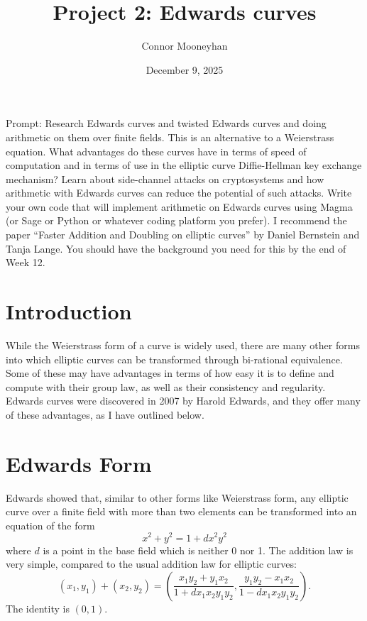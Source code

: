 \documentclass[12pt]{article}
\title{Project 2: Edwards curves}
\author{Connor Mooneyhan}
\date{December 9, 2025}
\theoremstyle{definition}
\begin{document}
\maketitle

Prompt: Research Edwards curves and twisted Edwards curves and doing arithmetic on them over finite fields.
This is an alternative to a Weierstrass equation.
What advantages do these curves have in terms of speed of computation and in terms of use in the elliptic curve Diffie-Hellman key exchange mechanism? Learn about side-channel attacks on cryptosystems and how arithmetic with Edwards curves can reduce the potential of such attacks.
Write your own code that will implement arithmetic on Edwards curves using Magma (or Sage or Python or whatever coding platform you prefer).
I recommend the paper “Faster Addition and Doubling on elliptic curves” by Daniel Bernstein and Tanja Lange.
You should have the background you need for this by the end of Week 12.

\section{Introduction}
While the Weierstrass form of a curve is widely used, there are many other forms into which elliptic curves can be transformed through bi-rational equivalence.
Some of these may have advantages in terms of how easy it is to define and compute with their group law, as well as their consistency and regularity.
Edwards curves were discovered in 2007 by Harold Edwards, and they offer many of these advantages, as I have outlined below.

\section{Edwards Form}
Edwards showed that, similar to other forms like Weierstrass form, any elliptic curve over a finite field with more than two elements can be transformed into an equation of the form \begin{equation*}
	x^2 + y^2 = 1 + dx^2y^2
\end{equation*}
where $d$ is a point in the base field which is neither 0 nor 1.
The addition law is very simple, compared to the usual addition law for elliptic curves: \begin{equation*}
	(x_1, y_1) + (x_2, y_2) = \left( \frac{x_1y_2 + y_1x_2}{1+dx_1x_2y_1y_2}, \frac{y_1y_2-x_1x_2}{1-dx_1x_2y_1y_2} \right).
\end{equation*}
The identity is $(0, 1)$.
\end{document}
